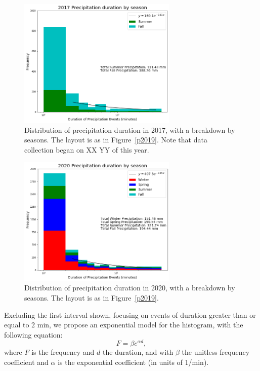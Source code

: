 \documentclass[11pt]{report}
\begin{document}
\clearpage
\begin{figure}[t]
	\centering
	\includegraphics[width=0.675\textwidth]{Figures/precip_2017.png}
	\caption[Precipitation histogram for 2017 broken down by
          season]{\label{p2017} Distribution of precipitation duration
          in 2017, with a breakdown by seasons. The layout is as in
          Figure~\ref{p2019}. Note that data collection began on XX YY
          of this year.}
\end{figure}
\begin{figure}[b]
	\centering
	\includegraphics[width=0.675\textwidth]{Figures/precip_2020.png}
	\caption[Precipitation histogram for 2020 broken down by season]{\label{p2020}
		Distribution of precipitation duration in 2020, with a breakdown
		by seasons. The layout is as in Figure~\ref{p2019}.}
\end{figure}

\clearpage
Excluding the first interval shown, focusing on events of duration
greater than or equal to 2 min, we propose an exponential model for
the histogram, with the following equation:
\begin{equation}
  F = \beta e^{\alpha d}
,
\end{equation}
where $F$ is the frequency and $d$ the duration, and with $\beta$ the
unitless frequency coefficient and $\alpha$ is the exponential
coefficient (in units of 1/min). 
	
\end{document}
